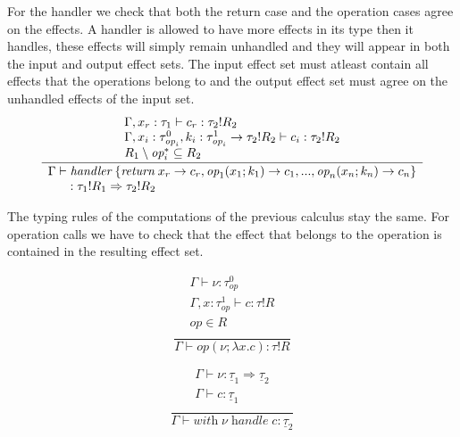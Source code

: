 \documentclass[12pt]{article}
\newcommand\eop[0]{\textit{op}}
\newcommand\eopa[0]{\textit{op}^*}
\newcommand\type[0]{\tau}
\newcommand\tarr[2]{#1 \rightarrow #2}
\newcommand\thandler[2]{#1 \Rightarrow #2}
\newcommand\ctype[0]{\underline{\type}}
\newcommand\cdirt[2]{#1 ! #2}
\newcommand\val[0]{\nu}
\newcommand\vhandler[1]{\textit{handler} \; \{#1\}}
\newcommand\comp[0]{c}
\newcommand\cop[4]{#1(#2 ; \lambda #3 . #4)}
\newcommand\chandle[2]{\textit{with} \; #1 \; \textit{handle} \; #2}
\begin{document}
For the handler we check that both the return case and the operation cases agree on the effects.
A handler is allowed to have more effects in its type then it handles, these effects will simply
remain unhandled and they will appear in both the input and output effect sets.
The input effect set must atleast contain all effects that the operations belong to and the output effect set
must agree on the unhandled effects of the input set.
\[\frac{
	\begin{array}{l}
	\Gamma , x_r : \type_1 \vdash \comp_r : \cdirt{\type_2}{R_2} \\
	\Gamma , x_i : \type^0_{\eop_i} , k_i : \tarr{\type^1_{\eop_i}}{\cdirt{\type_2}{R_2}} \vdash \comp_i : \cdirt{\type_2}{R_2} \\
	R_1 \setminus \eopa_i \subseteq R_2 \\
	\end{array}
}{
	\begin{array}{l}
	\Gamma \vdash \vhandler{
		\textit{return} \; x_r \rightarrow \comp_r,
		\eop_1 ( x_1 ; k_1 ) \rightarrow \comp_1,
		...,
		\eop_n ( x_n ; k_n ) \rightarrow \comp_n
	} \\ \indent : \thandler{\cdirt{\type_1}{R_1}}{\cdirt{\type_2}{R_2}}
	\end{array}
}\]

The typing rules of the computations of the previous calculus stay the same. For operation calls we have to check that the effect that belongs to the operation is contained in the resulting effect set. \\
\begin{minipage}{0.5\textwidth}
\[\frac{
	\begin{array}{l}
	\Gamma \vdash \val : \type^0_\eop \\
	\Gamma , x : \type^1_\eop \vdash \comp : \cdirt{\type}{R} \\
	\eop \in R \\
	\end{array}
}{
	\Gamma \vdash \cop{\eop}{\val}{x}{\comp} : \cdirt{\type}{R}
}\]
\end{minipage}
\begin{minipage}{0.5\textwidth}
\[\frac{
	\begin{array}{l}
	\Gamma \vdash \val : \thandler{\ctype_1}{\ctype_2} \\
	\Gamma \vdash \comp : \ctype_1 \\
	\end{array}
}{
	\Gamma \vdash \chandle{\val}{\comp} : \ctype_2
}\]
\end{minipage}
\end{document}

